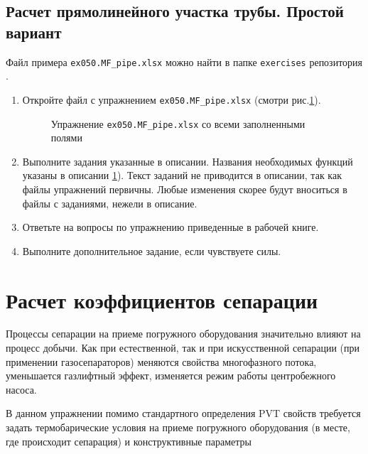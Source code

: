 \subsection{Расчет прямолинейного участка трубы. Простой вариант}
Файл примера \texttt{ex050.MF_pipe.xlsx} можно найти в папке \texttt{exercises} репозитория \unf{}.

\begin{enumerate}
	
	\item Откройте файл с упражнением \texttt{ex050.MF_pipe.xlsx} (смотри рис.\ref{ris:Ex50_1}).
	
	\begin{figure}[h!]
		\center{\texttt{[image: Ex50\_1]}}
		\caption{Упражнение \texttt{ex050.MF_pipe.xlsx} со всеми заполненными полями }
		\label{ris:Ex50_1}
	\end{figure}
	
	\item Выполните задания указанные в описании. Названия необходимых функций указаны в описании  \ref{ris:Ex50_1}). Текст заданий не приводится в описании, так как файлы упражнений первичны. Любые изменения скорее будут вноситься в файлы с заданиями, нежели в описание. 
	
	\item Ответьте на вопросы по упражнению приведенные в рабочей книге.
	
	\item Выполните дополнительное задание, если чувствуете силы.
	
\end{enumerate}





\section{Расчет коэффициентов сепарации}

Процессы сепарации на приеме погружного оборудования значительно влияют на процесс добычи. Как при естественной, так и при искусственной сепарации (при применении газосепараторов) меняются свойства многофазного потока, уменьшается газлифтный эффект, изменяется режим работы центробежного насоса.

В данном упражнении помимо стандартного определения PVT свойств требуется задать термобарические условия на приеме погружного оборудования (в месте, где происходит сепарация) и конструктивные параметры


